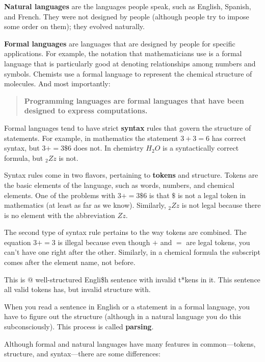 {\bf Natural languages} are the languages people speak, such as English,
Spanish, and French. They were not designed by people (although people try to
impose some order on them); they evolved naturally.

{\bf Formal languages} are languages that are designed by people for specific
applications. For example, the notation that mathematicians use is a formal
language that is particularly good at denoting relationships among numbers and
symbols. Chemists use a formal language to represent the chemical structure of
molecules. And most importantly:

\begin{quote}
{\bf Programming languages are formal languages that have been
designed to express computations.}
\end{quote}

Formal languages tend to have strict {\bf syntax} rules that govern the
structure of statements. For example, in mathematics the statement $3 + 3 = 6$
has correct syntax, but $3 + = 3 \$ 6$ does not. In chemistry $H_2O$ is a
syntactically correct formula, but $_2Zz$ is not.

Syntax rules come in two flavors, pertaining to {\bf tokens} and structure.
Tokens are the basic elements of the language, such as words, numbers, and
chemical elements. One of the problems with $3 += 3 \$ 6$ is that \( \$ \) is
not a legal token in mathematics (at least as far as we know). Similarly,
$_2Zz$ is not legal because there is no element with the abbreviation $Zz$.

The second type of syntax rule pertains to the way tokens are
combined. The equation $3 += 3$ is illegal because even though $+$
and $=$ are legal tokens, you can't have one right after the other.
Similarly, in a chemical formula the subscript comes after the element
name, not before.

This is @ well-structured Engli\$h sentence with invalid t*kens in it. This
sentence all valid tokens has, but invalid structure with.

When you read a sentence in English or a statement in a formal language, you
have to figure out the structure (although in a natural language you do this
subconsciously). This process is called {\bf parsing}. 

Although formal and natural languages have many features in common---tokens,
structure, and syntax---there are some differences:

